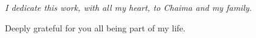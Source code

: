 \begin{dedication}
    \itshape             %
    \raggedleft          %
    I dedicate this work, with all my heart, to Chaima and my family.
    \par   %
    Deeply grateful for you all being part of my life.
    \vspace{\baselineskip}
    \par %
\end{dedication}